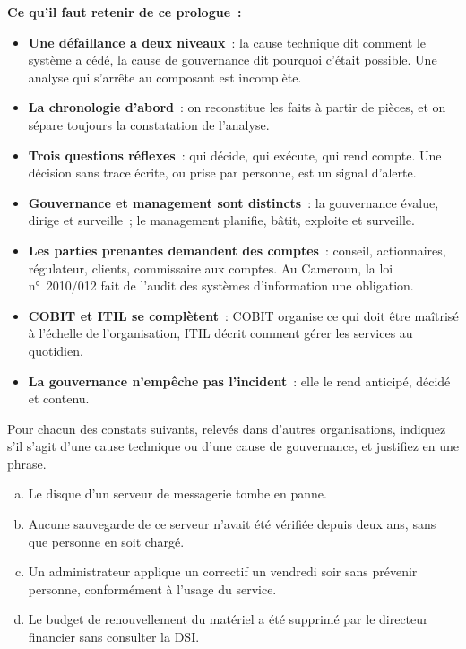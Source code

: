 \begin{boxresume}
\textbf{Ce qu'il faut retenir de ce prologue~:}

\begin{itemize}
    \item \textbf{Une défaillance a deux niveaux}~: la cause technique dit
          comment le système a cédé, la cause de gouvernance dit pourquoi
          c'était possible. Une analyse qui s'arrête au composant est
          incomplète.
    \item \textbf{La chronologie d'abord}~: on reconstitue les faits à partir
          de pièces, et on sépare toujours la constatation de l'analyse.
    \item \textbf{Trois questions réflexes}~: qui décide, qui exécute, qui
          rend compte. Une décision sans trace écrite, ou prise par
          personne, est un signal d'alerte.
    \item \textbf{Gouvernance et management sont distincts}~: la gouvernance
          évalue, dirige et surveille~; le management planifie, bâtit,
          exploite et surveille.
    \item \textbf{Les parties prenantes demandent des comptes}~: conseil,
          actionnaires, régulateur, clients, commissaire aux comptes. Au
          Cameroun, la loi n°~2010/012 fait de l'audit des systèmes
          d'information une obligation.
    \item \textbf{COBIT et ITIL se complètent}~: COBIT organise ce qui doit
          être maîtrisé à l'échelle de l'organisation, ITIL décrit comment
          gérer les services au quotidien.
    \item \textbf{La gouvernance n'empêche pas l'incident}~: elle le rend
          anticipé, décidé et contenu.
\end{itemize}
\end{boxresume}

\bigskip

\begin{boxexo}[title={\ding{45}\quad Exercice~P.1. Technique ou gouvernance~? \niveaubase}]
Pour chacun des constats suivants, relevés dans d'autres organisations,
indiquez s'il s'agit d'une cause technique ou d'une cause de gouvernance,
et justifiez en une phrase.
\begin{enumerate}[(a)]
    \item Le disque d'un serveur de messagerie tombe en panne.
    \item Aucune sauvegarde de ce serveur n'avait été vérifiée depuis
          deux ans, sans que personne en soit chargé.
    \item Un administrateur applique un correctif un vendredi soir sans
          prévenir personne, conformément à l'usage du service.
    \item Le budget de renouvellement du matériel a été supprimé par le
          directeur financier sans consulter la DSI.
\end{enumerate}
\end{boxexo}

